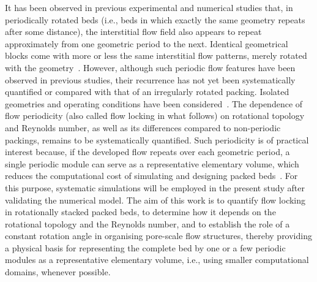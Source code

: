 It has been observed in previous experimental and numerical studies that, in periodically rotated beds (i.e., beds in which exactly the same geometry repeats after some distance), the interstitial flow field also appears to repeat approximately from one geometric period to the next. Identical geometrical blocks come with more or less the same interstitial flow patterns, merely rotated with the geometry~\cite{demir2026pressure}. However, although such periodic flow features have been observed in previous studies, their recurrence has not yet been systematically quantified or compared with that of an irregularly rotated packing. Isolated geometries and operating conditions have been considered~\cite{sadowski2025mean}. The dependence of flow periodicity (also called flow locking in what follows) on rotational topology and Reynolds number, as well as its differences compared to non-periodic packings,
remains to be systematically quantified. Such periodicity is of practical interest because, if the developed flow repeats over each geometric period, a single periodic module can serve as a representative elementary volume, which reduces the computational cost of simulating and designing packed beds~\cite{patankar1977periodic,ou2024parameter}. For this purpose, systematic simulations will be employed in the present study after validating the numerical model. The aim of this work is to quantify flow locking in rotationally stacked packed beds, to determine how it depends on the rotational topology and the Reynolds number, and to establish the role of a constant rotation angle in organising pore-scale flow structures, thereby providing a physical basis for representing the complete bed by one or a few periodic modules as a representative elementary volume, i.e., using smaller computational domains, whenever possible.


